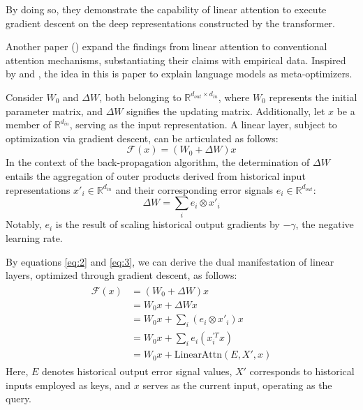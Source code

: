 \documentclass[11pt]{article}
\begin{document}
By doing so, they demonstrate the capability of linear attention to execute gradient descent on the deep representations constructed by the transformer.


Another paper (\cite{2022arXiv221210559D}) expand the findings from linear attention to conventional attention mechanisms, substantiating their claims with empirical data.
Inspired by \cite{Aizerman2019TheoreticalFO} and \cite{unknown}, the idea in this is paper to explain language models as meta-optimizers.

Consider $W_0$ and $\Delta W$, both belonging to $\mathbb{R}^{d_{out} \times d_{in}}$, where $W_0$ represents the initial parameter matrix, and $\Delta W$ signifies the updating matrix. Additionally, let $x$ be a member of $\mathbb{R}^{d_{in}}$, serving as the input representation. A linear layer, subject to optimization via gradient descent, can be articulated as follows:
\begin{equation}
	\mathcal{F}(x) = (W_0 + \Delta W)x \label{eq:2}
\end{equation}
In the context of the back-propagation algorithm, the determination of $\Delta W$ entails the aggregation of outer products derived from historical input representations $x'_i \in \mathbb{R}^{d_{in}}$ and their corresponding error signals $e_i \in \mathbb{R}^{d_{out}}$:
\begin{equation}
	\Delta W = \sum_{i} e_i \otimes x'_i \label{eq:3}
\end{equation}
Notably, $e_i$ is the result of scaling historical output gradients by $-\gamma$, the negative learning rate.

By equations \eqref{eq:2} and \eqref{eq:3}, we can derive the dual manifestation of linear layers, optimized through gradient descent, as follows:
\begin{align}
	\begin{split}
		\mathcal{F}(x) &= (W_0 + \Delta W)x \\
		&= W_0x + \Delta Wx \\
		&= W_0x + \sum_{i} (e_i \otimes x'_i)x \\
		&= W_0x + \sum_{i} e_i(x^{'T}_ix) \\
		&= W_0x + \text{LinearAttn}(E, X', x)
	\end{split}
	\label{eq:4}
\end{align}
Here, $E$ denotes historical output error signal values, $X'$ corresponds to historical inputs employed as keys, and $x$ serves as the current input, operating as the query.
\end{document}
